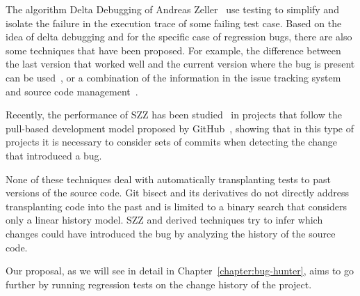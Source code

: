 The algorithm Delta Debugging of Andreas Zeller~\cite{zeller2002simplifying,zeller2002isolating} use testing to simplify and isolate the failure in the execution trace of some failing test case.
Based on the idea of delta debugging and for the specific case of regression bugs, there are also some techniques that have been proposed. 
For example, the difference between the last version that worked well and the current version where the bug is present can be used~\cite{saha2017selective}, or a combination of the information in the issue tracking system and source code management~\cite{khattar2015sarathi}.

Recently, the performance of SZZ has been studied~\cite{bludau2022pr,petrulio2022szz} in projects that follow the pull-based development
model proposed by GitHub~\cite{gousios2014exploratory}, showing that in this type of projects it is necessary to consider sets of commits when detecting the change that introduced a bug.

None of these techniques deal with automatically transplanting tests to past versions of the source code. 
Git bisect and its derivatives do not directly address transplanting code into the past and is limited to a binary search that considers only a linear history model.
SZZ and derived techniques try to infer which changes could have introduced the bug by analyzing the history of the source code.

Our proposal, as we will see in detail in Chapter~\ref{chapter:bug-hunter}, aims to go further by running regression tests on the change history of the project.